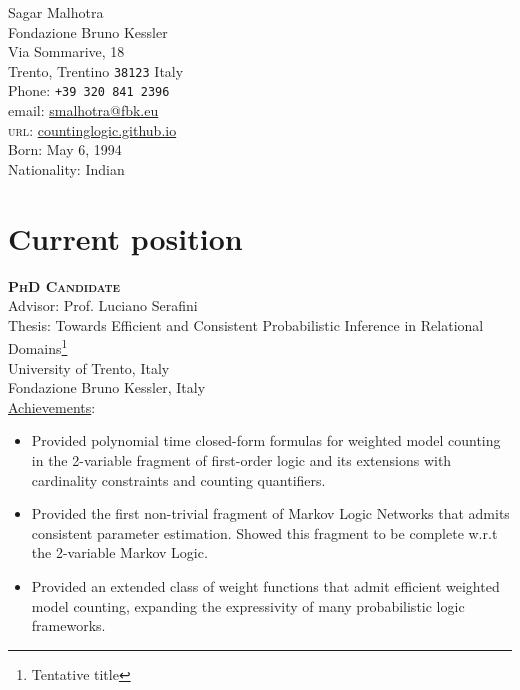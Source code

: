 \documentclass[10pt, a4paper]{article}
\newcommand{\years}[1]{\marginnote{\scriptsize #1}}
\begin{document}
{\LARGE Sagar Malhotra }\\[0.1cm]
 Fondazione Bruno Kessler\\
 Via Sommarive, 18\\
Trento, Trentino \texttt{38123}
Italy\\
Phone: \texttt{+39 320 841 2396}\\
email: \href{mailto:smalhotra@fbk.eu}{smalhotra@fbk.eu}\\
\textsc{url}: \href{https://countinglogic.github.io}{countinglogic.github.io}\\
Born:  May 6, 1994\\
Nationality:  Indian

\section*{Current position}
\noindent
\years{11.2019-01.2023}\textsc{\textbf{PhD Candidate}}\\
Advisor: Prof. Luciano Serafini\\
Thesis: Towards Efficient and Consistent Probabilistic Inference in Relational Domains\footnote{Tentative title}\\
University of Trento, Italy\\
Fondazione Bruno Kessler, Italy\\
\underline{Achievements}:
\begin{itemize}
    \item Provided polynomial time closed-form formulas for weighted model counting in the 2-variable fragment of first-order logic and its extensions with cardinality constraints and counting quantifiers.
    \item Provided the first non-trivial fragment of Markov Logic Networks that admits consistent parameter estimation. Showed this fragment to be complete w.r.t the 2-variable Markov Logic.
    \item Provided an extended class of weight functions that admit efficient weighted model counting, expanding the expressivity of many probabilistic logic frameworks.
\end{itemize}
\end{document}

